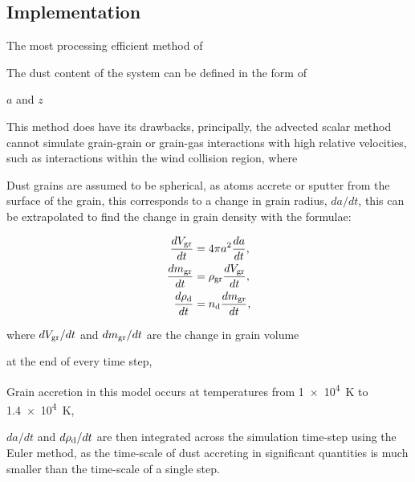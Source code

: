 \subsection{Implementation}

\parencite{dwekCoolingSputteringInfrared1996}


The most processing efficient method of 


The dust content of the system can be defined in the form of 

$a$ and $z$


This method does have its drawbacks, principally, the advected scalar method cannot simulate grain-grain or grain-gas interactions with high relative velocities, such as interactions within the wind collision region, where 




Dust grains are assumed to be spherical, as atoms accrete or sputter from the surface of the grain, this corresponds to a change in grain radius, $da/dt$, this can be extrapolated to find the change in grain density with the formulae:

\begin{subequations}
  \begin{align}
    \frac{dV_\text{gr}}{dt} & = 4 \pi a^2 \frac{da}{dt} ,\\
    \frac{dm_\text{gr}}{dt} & = \rho_\text{gr} \frac{dV_\text{gr}}{dt} ,\\
    \frac{d\rho_\text{d}}{dt}   & = n_\text{d} \frac{dm_\text{gr}}{dt} ,
  \end{align}
\end{subequations}

where $dV_\text{gr}/dt$ and $dm_\text{gr}/dt$ are the change in grain volume 

at the end of every time step, 







Grain accretion in this model occurs at temperatures from \SI{1e4}{\kelvin} to \SI{1.4e4}{\kelvin},




$da/dt$ and $d\rho_\text{d}/dt$ are then integrated across the simulation time-step using the Euler method, as the time-scale of dust accreting in significant quantities is much smaller than the time-scale of a single step.


